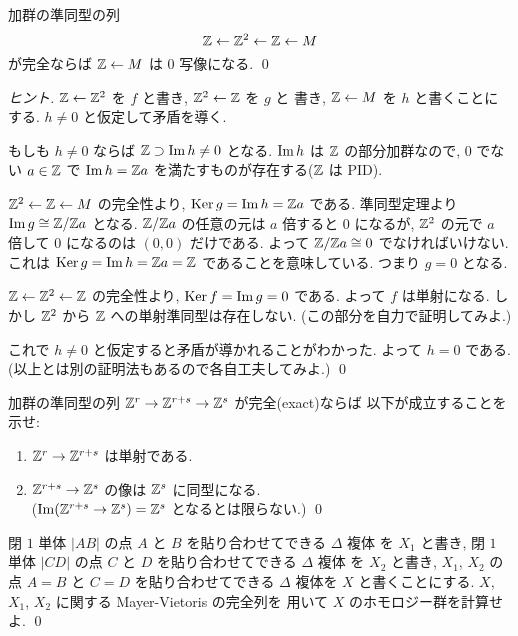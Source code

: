 \documentclass[12pt,twoside]{jarticle}
\begin{document}
\begin{question}[以下の問題のヒントでよく使われる結果]
\label{q:ZZ2ZM}
  加群の準同型の列 
  \begin{equation*}
    {\mathbb Z} \leftarrow {\mathbb Z}^2 \leftarrow {\mathbb Z} \leftarrow M
  \end{equation*}
  が完全ならば ${\mathbb Z}\leftarrow M$ は $0$ 写像になる. \qed
\end{question}

\begin{proof}[ヒント]
  ${\mathbb Z}\leftarrow{\mathbb Z}^2$ を $f$ と書き, ${\mathbb Z}^2\leftarrow{\mathbb Z}$ を $g$ と
  書き, ${\mathbb Z}\leftarrow M$ を $h$ と書くことにする.
  $h\ne 0$ と仮定して矛盾を導く.

  もしも $h\ne 0$ ならば ${\mathbb Z}\supset \mathop{\mathrm{Im}}\nolimits h \ne 0$ となる.
  $\mathop{\mathrm{Im}}\nolimits h$ は ${\mathbb Z}$ の部分加群なので, $0$ でない $a\in{\mathbb Z}$ 
  で $\mathop{\mathrm{Im}}\nolimits h = {\mathbb Z} a$ を満たすものが存在する(${\mathbb Z}$ は PID).
  
  ${\mathbb Z}^2\leftarrow{\mathbb Z}\leftarrow M$ の完全性より, 
  $\mathop{\mathrm{Ker}}\nolimits g = \mathop{\mathrm{Im}}\nolimits h = {\mathbb Z} a$ である.
  準同型定理より $\mathop{\mathrm{Im}}\nolimits g \cong {\mathbb Z}/{\mathbb Z} a$ となる.
  ${\mathbb Z}/{\mathbb Z} a$ の任意の元は $a$ 倍すると $0$ になるが,
  ${\mathbb Z}^2$ の元で $a$ 倍して $0$ になるのは $(0,0)$ だけである.
  よって ${\mathbb Z}/{\mathbb Z} a \cong 0$ でなければいけない.
  これは $\mathop{\mathrm{Ker}}\nolimits g = \mathop{\mathrm{Im}}\nolimits h = {\mathbb Z} a = {\mathbb Z}$ であることを意味している.
  つまり $g=0$ となる.

  ${\mathbb Z} \leftarrow {\mathbb Z}^2 \leftarrow {\mathbb Z}$ の完全性より,
  $\mathop{\mathrm{Ker}}\nolimits f = \mathop{\mathrm{Im}}\nolimits g = 0$ である.
  よって $f$ は単射になる.
  しかし ${\mathbb Z}^2$ から ${\mathbb Z}$ への単射準同型は存在しない.
  (この部分を自力で証明してみよ.)

  これで $h\ne 0$ と仮定すると矛盾が導かれることがわかった.
  よって $h=0$ である.
  (以上とは別の証明法もあるので各自工夫してみよ.)
  \qed
\end{proof}

\begin{question}
 加群の準同型の列 ${\mathbb Z}^r\to{\mathbb Z}^{r+s}\to{\mathbb Z}^s$ が完全(exact)ならば
 以下が成立することを示せ:
 \begin{enumerate}
 \item ${\mathbb Z}^r\to{\mathbb Z}^{r+s}$ は単射である.
 \item ${\mathbb Z}^{r+s}\to{\mathbb Z}^s$ の像は ${\mathbb Z}^s$ に同型になる.\\
  ($\mathop{\mathrm{Im}}\nolimits({\mathbb Z}^{r+s}\to{\mathbb Z}^s) = {\mathbb Z}^s$ となるとは限らない.)
  \qed
 \end{enumerate}
\end{question}

\begin{question}[∞]
  \label{q:infty}
  閉 $1$ 単体 $|AB|$ の点 $A$ と $B$ を貼り合わせてできる $\Delta$ 複体
  を $X_1$ と書き, 
  閉 $1$ 単体 $|CD|$ の点 $C$ と $D$ を貼り合わせてできる $\Delta$ 複体
  を $X_2$ と書き,
  $X_1$, $X_2$ の点 $A=B$ と $C=D$ を貼り合わせてできる $\Delta$ 複体を $X$ 
  と書くことにする.
  $X$, $X_1$, $X_2$ に関する Mayer-Vietoris の完全列を
  用いて $X$ のホモロジー群を計算せよ.
  \qed
\end{question}
\end{document}
